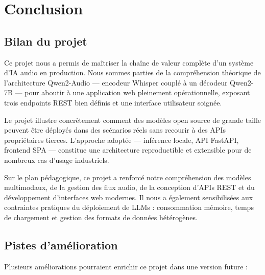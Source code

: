 \documentclass[12pt,a4paper]{report}
\begin{document}
\chapter{Conclusion}

\section{Bilan du projet}

Ce projet nous a permis de maîtriser la chaîne de valeur complète d'un système d'IA
audio en production. Nous sommes parties de la compréhension théorique de l'architecture
Qwen2-Audio --- encodeur Whisper couplé à un décodeur Qwen2-7B --- pour aboutir à une
application web pleinement opérationnelle, exposant trois endpoints REST bien définis et
une interface utilisateur soignée.

Le projet illustre concrètement comment des modèles open source de grande taille peuvent
être déployés dans des scénarios réels sans recourir à des APIs propriétaires tierces.
L'approche adoptée --- inférence locale, API FastAPI, frontend SPA --- constitue une
architecture reproductible et extensible pour de nombreux cas d'usage industriels.

Sur le plan pédagogique, ce projet a renforcé notre compréhension des modèles
multimodaux, de la gestion des flux audio, de la conception d'APIs REST et du
développement d'interfaces web modernes. Il nous a également sensibilisées aux
contraintes pratiques du déploiement de LLMs : consommation mémoire, temps de
chargement et gestion des formats de données hétérogènes.

\section{Pistes d'amélioration}

Plusieurs améliorations pourraient enrichir ce projet dans une version future :
\end{document}
